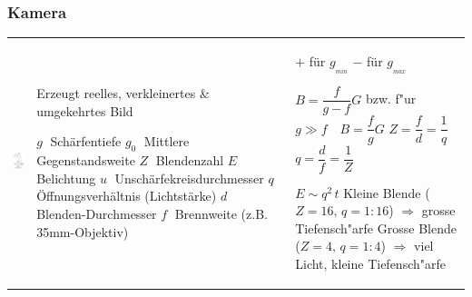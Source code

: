 \subsubsection{Kamera  }
\begin{tabular}{lll}
  \parbox{3cm}{
    \includegraphics[width=3cm]{./bilder/kamera.png}} &
  \parbox{7cm}{
    Erzeugt reelles, verkleinertes \& umgekehrtes Bild \\
    \\
    $g \;$ Schärfentiefe\\
    $g_0 \;$ Mittlere Gegenstandsweite\\
    $Z \;$ Blendenzahl \\
    $E \;$ Belichtung \\
    $u \;$ Unschärfekreisdurchmesser \\
    $q \;$ Öffnungsverhältnis (Lichtstärke) \\
    $d \;$ Blenden-Durchmesser \\
    $f \;$ Brennweite (z.B. 35mm-Objektiv)} &
  \parbox{8cm}{
     \parbox{4cm}{
        $+$ für $g_{_{min}}$\\
        $-$ für $g_{_{max}}$} 
        \\
    $B=\dfrac{f}{g-f}G$ \qquad bzw. f"ur $g\gg f\quad B=\dfrac{f}{g}G$\\
    $Z = \dfrac{f}{d} = \dfrac1q$ \qquad $q = \dfrac{d}{f} = \dfrac1Z$ 
    \\
    $E\sim q^2\,t$ \\
    Kleine Blende ($Z=16, \,q=1:16$)\\ 
    $\Rightarrow$ grosse Tiefensch"arfe\\
    Grosse Blende ($Z=4,\,q=1:4$) \\ 
    $\Rightarrow$ viel Licht, kleine Tiefensch"arfe} \\
\end{tabular}

